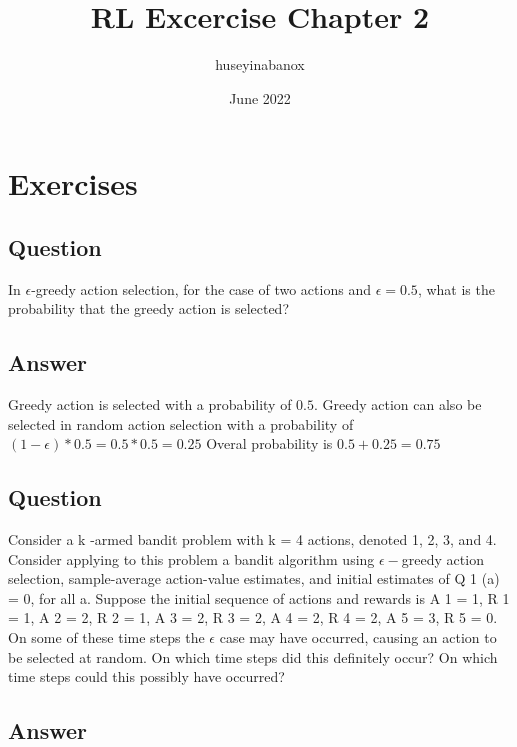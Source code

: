 \documentclass{article}
\title{RL Excercise Chapter 2}
\author{huseyinabanox }
\date{June 2022}
\begin{document}
    \maketitle
    \setcounter{section}{1}


    \section{Exercises}

    \subsection{Question}
    In \(\epsilon\)-greedy action selection, for the case of two actions and \(\epsilon = 0.5 \), what is the probability that the greedy action is selected?

    \subsection*{Answer}

    Greedy action is selected with a probability of $0.5$. Greedy action can also be selected in random action selection with a probability of $(1-\epsilon)*0.5 = 0.5 * 0.5 = 0.25 $
    Overal probability is $ 0.5 + 0.25 = 0.75 $

    \subsection{Question}

    Consider a k -armed bandit problem with k = 4 actions,
    denoted 1, 2, 3, and 4. Consider applying to this problem a bandit algorithm using
    $\epsilon-$greedy action selection, sample-average action-value estimates, and initial estimates
    of Q 1 (a) = 0, for all a. Suppose the initial sequence of actions and rewards is A 1 = 1,
    R 1 = 1, A 2 = 2, R 2 = 1, A 3 = 2, R 3 = 2, A 4 = 2, R 4 = 2, A 5 = 3, R 5 = 0. On some
    of these time steps the $\epsilon$ case may have occurred, causing an action to be selected at
    random. On which time steps did this definitely occur? On which time steps could this
    possibly have occurred?

    \subsection*{Answer}
\end{document}
